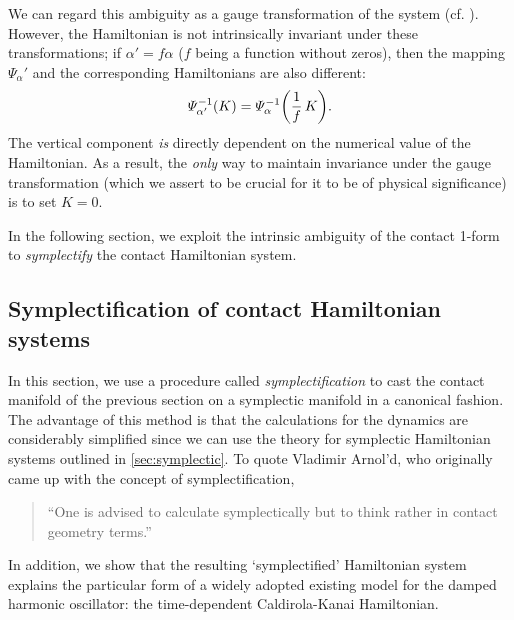We can regard this ambiguity as a gauge transformation of the system (cf. \citet{Balian2001}). However, the Hamiltonian is not intrinsically invariant under these transformations; if \( \alpha' = f \alpha \) (\(f\) being a function without zeros), then the mapping \(\Psi_\alpha'\) and the corresponding Hamiltonians are also different: \cite[p. 321]{Libermann1987} 
\begin{equation}
    \Psi^{-1}_{\alpha'}(K) = \Psi^{-1}_{\alpha}\qty(\frac{1}{f}\,K).
    \label{eq:contact_ham_scaling}
\end{equation}
The vertical component \emph{is} directly dependent on the numerical value of the Hamiltonian. As a result, the \emph{only} way to maintain invariance under the gauge transformation (which we assert to be crucial for it to be of physical significance) is to set \(K = 0\).

In the following section, we exploit the intrinsic ambiguity of the contact 1-form to \emph{symplectify} the contact Hamiltonian system.

\subsection{Symplectification of contact Hamiltonian systems}
\label{ssec:symplectification}
In this section, we use a procedure called \emph{symplectification} to cast the contact manifold of the previous section on a symplectic manifold in a canonical fashion. The advantage of this method is that the calculations for the dynamics are considerably simplified since we can use the theory for symplectic Hamiltonian systems outlined in \cref{sec:symplectic}. To quote Vladimir Arnol'd, who originally came up with the concept of symplectification,  \cite{VanderSchaft2021a,Arnold1989a}
\begin{quote}
    ``One is advised to calculate symplectically but to think rather in contact geometry terms.''
\end{quote}
In addition, we show that the resulting `symplectified' Hamiltonian system explains the particular form of a widely adopted existing model for the damped harmonic oscillator: the time-dependent Caldirola-Kanai Hamiltonian.

